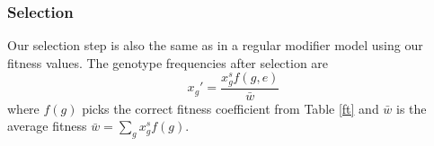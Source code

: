 \subsubsection{Selection}
Our selection step is also the same as in a regular modifier model using our fitness values.
The genotype frequencies after selection are
$$x_g' = \frac{x_g^sf(g,e)}{\bar{w}}$$
where $f(g)$ picks the correct fitness coefficient from Table \ref{ft} and $\bar{w}$ is the average fitness $\bar{w} = \sum_g x_g^sf(g)$.


